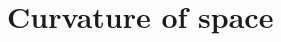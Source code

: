 \chapter{Curvature of space}
\pagebreak[4]
\begin{comment}
\section{p82 - Exercise}
\begin{tcolorbox}
Explain why the surfaces of an ordinary cylinder and an ordinary cone are to be regarded as "flat" in the sense of our definition.
\end{tcolorbox}
The reason is because those surfaces can be "unwrapped" like the figure below shows. 
\begin{figure}[h]


\caption{Unwrapping of a cone}
\end{figure}\\
For the cone, we can for each point $\ P $ on the cone, lying on a distance $\ h $ from the apex and making an angle $\theta $,  associate on a plane,  a  point $ P^* $ lying at the same  distance $ h $ from the apex, taken as origin for the coordinate system, and making an angle $\phi =  \theta \sin{\alpha} $ with $ \alpha $ the angle of the cone. This pair of coordinates are polar coordinates with $ r \in (-\infty, + \infty)$ and $\theta \in [0, 2k\pi)$. 
The same reasoning can be applied to a cylinder which is a cone with the apex at $\infty$. In that case the coordinate system becomes a Cartesian coordinate system. \\
As a continuous mapping exist from polar to orthogonal Cartesian coordinates both  coordinate system can be written under the required form (3.101) and so can be called "flat".

$$\blacklozenge$$
\newpage

\section{p83 - Exercise}
\begin{tcolorbox}
What are the values of $R^s_{.rmn}$ in an Euclidean plane, the coordinates being rectangular Cartesians? Deduce the values of the components of this tensor for polar coordinates from its tensor character, or else by direct calculation.
\end{tcolorbox}
See 2.64 page 139 (exercise 18).
$$\blacklozenge$$
\newpage


\end{comment}
